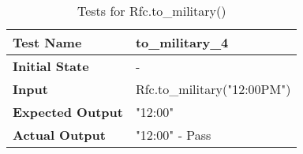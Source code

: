 \documentclass[12pt, titlepage]{article}
\begin{document}
			\hfill	%
	    \begin{table}[!htbp]
			\begin{tabularx}{\textwidth}{|l|X|}%
				\hline
                \textbf{Test Name} & to\_military\_4  
                \\\hline
                \textbf{Initial State} & -
                \\\hline
                \textbf{Input} & Rfc.to\_military("12:00PM")
                \\\hline 
                \textbf{Expected Output} & "12:00"
                \\\hline
                \textbf{Actual Output} & "12:00" - Pass
                \\\hline
			\end{tabularx}\\ %
			\caption{Tests for Rfc.to\_military()}
			\label{Table}
	    \end{table}

\FloatBarrier       %
\end{document}
